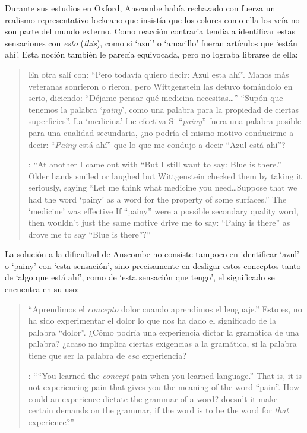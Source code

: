 Durante sus estudios en Oxford, Anscombe había rechazado con fuerza un realismo representativo lockeano que insistía que los colores como ella los veía no son parte del mundo externo. Como reacción contraria tendía a identificar estas sensaciones con \emph{esto} (\emph{this}), como si `azul' o `amarillo' fueran artículos que `están ahí'. Esta noción también le parecía equivocada, pero no lograba librarse de ella: \blockquote[{\Cite[viii]{anscombe1981metaphysics}}: \enquote{At another  I came out with ``But I still want to say: Blue is there.'' Older hands smiled or laughed but Wittgenstein checked them by taking it seriously, saying ``Let me think what medicine you need\ldots Suppose that we had the word `painy' as a word for the property of some surfaces.'' The `medicine' was effective \textelp{} If ``painy'' were a possible secondary quality word, then wouldn't just the same motive drive me to say: ``Painy is there'' as drove me to say ``Blue is there''?}]{En otra  salí con: ``Pero todavía quiero decir: Azul esta ahí''. Manos más veteranas sonrieron o rieron, pero Wittgenstein las detuvo tomándolo en serio, diciendo: ``Déjame pensar qué medicina necesitas\ldots'' ``Supón que tenemos la palabra `\emph{painy}', como una palabra para la propiedad de ciertas superficies''. La `medicina' fue efectiva \textelp{} Si ``\emph{painy}'' fuera una palabra posible para una cualidad secundaria, ¿no podría el mismo motivo conducirme a decir: ``\emph{Painy} está ahí'' que lo que me condujo a decir ``Azul está ahí''?} La solución a la dificultad de Anscombe no consiste tampoco en identificar `azul' o `painy' con `esta sensación', sino precisamente en desligar estos conceptos tanto de `algo que está ahí', como de `esta sensación que tengo', el significado se encuentra en su uso: \blockquote[{\Cite[114]{anscombe1981parmenides:qli}}: \enquote{``You learned the \emph{concept} pain when you learned language.'' That is, it is not experiencing pain that gives you the meaning of the word ``pain''. How could an experience dictate the grammar of a word? \textelp{} doesn't it make certain demands on the grammar, if the word is to be the word for \emph{that} experience?}]{``Aprendimos el \emph{concepto} dolor cuando aprendimos el lenguaje.'' Esto es, no ha sido experimentar el dolor lo que nos ha dado el significado de la palabra ``dolor''. ¿Cómo podría una experiencia dictar la gramática de una palabra? \textelp{} ¿acaso no implica ciertas exigencias a la gramática, si la palabra tiene que ser la palabra de \emph{esa} experiencia?}

